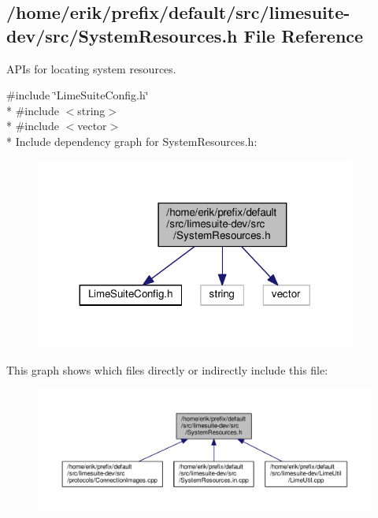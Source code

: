 \subsection{/home/erik/prefix/default/src/limesuite-\/dev/src/\+System\+Resources.h File Reference}
\label{SystemResources_8h}


A\+P\+Is for locating system resources.  


{\ttfamily \#include \char`\"{}Lime\+Suite\+Config.\+h\char`\"{}}\\*
{\ttfamily \#include $<$string$>$}\\*
{\ttfamily \#include $<$vector$>$}\\*
Include dependency graph for System\+Resources.\+h\+:
\nopagebreak
\begin{figure}[H]
\begin{center}
\leavevmode
\includegraphics[width=299pt]{d1/da3/SystemResources_8h__incl}
\end{center}
\end{figure}
This graph shows which files directly or indirectly include this file\+:
\nopagebreak
\begin{figure}[H]
\begin{center}
\leavevmode
\includegraphics[width=350pt]{d6/d2b/SystemResources_8h__dep__incl}
\end{center}
\end{figure}
